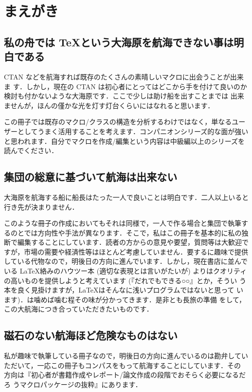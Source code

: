 ﻿\chapter{まえがき}

\section*{私の舟では \TeX という大海原を航海できない事は明白である}

CTAN などを航海すれば既存のたくさんの素晴しいマクロに出会うことが出来ま
す．しかし，現在の CTAN は初心者にとってはどこから手を付けて良いのか
検討も付かないような大海原です．ここで少しは助け船を出すことまでは
出来ませんが，ほんの僅かな光を灯す灯台くらいにはなれると思います．

この冊子では既存のマクロ/クラスの構造を分析するわけではなく，単なるユー
ザーとしてうまく活用することを考えます．コンパニオンシリーズ的な面が強い
と思われます．自分でマクロを作成/編集という内容は中級編以上のシリーズを
読んでください．


\section*{集団の総意に基づいて航海は出来ない}

大海原を航海する船に船長はたった一人で良いことは明白です．二人以上いると
行き先が決まりません．

このような冊子の作成においてもそれは同様で，一人で作る場合と集団で執筆す
るのとでは方向性や手法が異なります．そこで，私はこの冊子を基本的に私の独
断で編集することにしています．読者の方からの意見や要望，質問等は大歓迎で
すが，市場の需要や経済性等はほとんど考慮していません．要するに趣味で提供
している代物なので，明後日の方向に進んでいます．しかし，現在書店に並んで
いる \LaTeX 絡みのハウツー本 (適切な表現とは言いがたいが) よりはクオリティ
の高いものを提供しようと考えています (『だれでもできる○○』とか，そうい
う本を良く見掛けますが，\LaTeX はそんなに浅いプログラムではないと思って
います)．\laTEX は噛めば噛む程その味が分かってきます．是非とも長旅の準備
をして，この大航海につき合っていただきたいものです．

\section*{磁石のない航海ほど危険なものはない}

私が趣味で執筆している冊子なので，明後日の方向に進んでいるのは勘弁してい
ただいて，一応この冊子もコンパスをもって航海することにしています．その
方向は『初心者が書籍作成やレポート/論文作成の段階でおそらく必要になるだろ
うマクロパッケージの抜粋』にあります．


